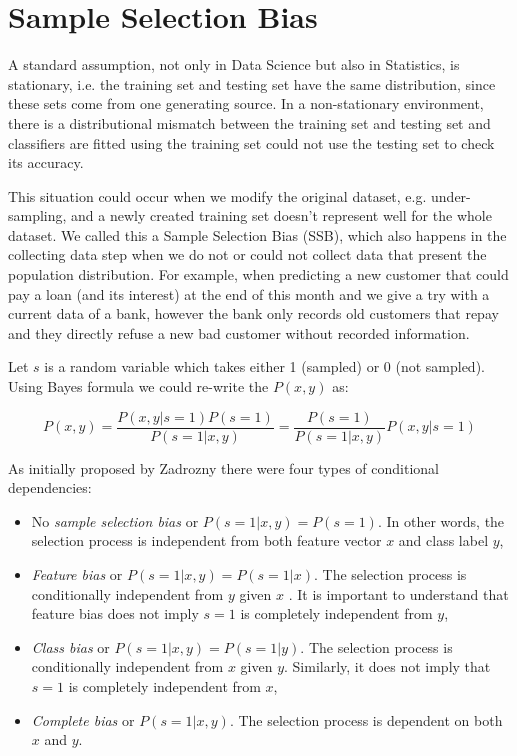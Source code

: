 \section{Sample Selection Bias}
\label{sample_selection_bias}

A standard assumption, not only in Data Science but also in Statistics, is stationary, i.e. the training set and testing set have the same distribution, since these sets come from one generating source. In a non-stationary environment, there is a distributional mismatch between the training set and testing set and classifiers are fitted using the training set could not use the testing set to check its accuracy.

This situation could occur when we modify the original dataset, e.g. under-sampling, and a newly created training set doesn't represent well for the whole dataset. We called this a Sample Selection Bias (SSB), which also happens in the collecting data step when we do not or could not collect data that present the population distribution. For example, when predicting a new customer that could pay a loan (and its interest) at the end of this month and we give a try with a current data of a bank, however the bank only records old customers that repay and they directly refuse a new bad customer without recorded information.

Let $s$ is a random variable which takes either 1 (sampled) or 0 (not sampled). Using Bayes formula we could re-write the $P(x,y)$ as:


\begin{equation}
P(x, y) = \dfrac{ P(x, y|s = 1)P(s = 1) }{ P(s = 1|x, y) } = \dfrac{ P(s = 1) }{ P(s = 1|x, y) } P(x, y|s = 1)
\end{equation}


As initially proposed by Zadrozny \citep{zadrozny2004learning} there were four types of conditional dependencies:

\begin{itemize}
\item No \textit{sample selection bias} or $P(s = 1|x, y) = P(s = 1)$. In other words, the selection process is independent from both feature vector $x$ and class label $y$,
\item \textit{Feature bias} or $P(s = 1|x, y) = P(s = 1|x)$. The selection process is conditionally independent from $y$ given $x$ . It is important to understand that feature bias does not imply $s = 1$ is completely independent from $y$,
\item \textit{Class bias} or $P(s = 1|x, y) = P(s = 1|y)$. The selection process is conditionally independent from $x$ given $y$. Similarly, it does not imply that $s = 1$ is completely independent from $x$,
\item \textit{Complete bias} or $P(s = 1|x, y)$. The selection process is dependent on both $x$ and $y$.
\end{itemize}


